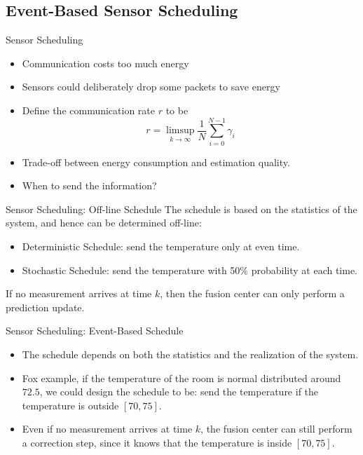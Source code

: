 \documentclass[10pt]{beamer}
\DeclareMathOperator{\1}{\textbf{1}}
\begin{document}
\subsection{Event-Based Sensor Scheduling}
\frame{\tableofcontents[currentsection]}
\begin{frame}{Sensor Scheduling}
  \begin{itemize}
    \item Communication costs too much energy
    \item Sensors could deliberately drop some packets to save energy
    \item Define the communication rate $r$ to be
      \begin{displaymath}
	r = \limsup_{k\rightarrow\infty}\frac{1}{N}\sum_{i=0}^{N-1}\gamma_i 
      \end{displaymath}
    \item Trade-off between energy consumption and estimation quality.
    \item When to send the information?
  \end{itemize}
\end{frame}

\begin{frame}{Sensor Scheduling: Off-line Schedule}
  The schedule is based on the statistics of the system, and hence can be determined off-line:
  \begin{itemize}
    \item Deterministic Schedule: send the temperature only at even time. 
    \item Stochastic Schedule: send the temperature with 50\% probability at each time. 
  \end{itemize}

  If no measurement arrives at time $k$, then the fusion center can only perform a prediction update.
\end{frame}

\begin{frame}{Sensor Scheduling: Event-Based Schedule}
  \begin{itemize}
    \item The schedule depends on both the statistics and the realization of the system. 
    \item Fox example, if the temperature of the room is normal distributed around $72.5$, we could design the schedule to be: send the temperature if the temperature is outside $[70,75]$.
    \item Even if no measurement arrives at time $k$, the fusion center can still perform a correction step, since it knows that the temperature is inside $[70,75]$.
  \end{itemize}
\end{frame}
\end{document}
